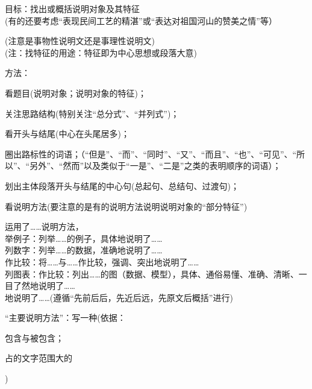 目标：找出或概括说明对象及其特征\\
(有的还要考虑``表现民间工艺的精湛''或``表达对祖国河山的赞美之情''等）\par
(注意是事物性说明文还是事理性说明文)\\
(注：找特征的用途：特征即为中心思想或段落大意)\par
方法：\begin{asparaenum}[(1)]\item 看题目(说明对象；说明对象的特征)；
        \item 关注思路结构(特别关注``总分式''、``并列式'')；
        \item 看开头与结尾(中心在头尾居多)；
        \item 圈出路标性的词语；（``但是''、``而''、``同时''、``又''、``而且''、``也''、``可见''、``所以''、``另外''、``然而''以及类似于``一是''、``二是''之类的表明顺序的词语）；
        \item 划出主体段落开头与结尾的中心句(总起句、总结句、过渡句)；
        \item 看说明方法(要注意的是有的说明方法说明说明对象的``部分特征'')\end{asparaenum}

运用了\ldots{}\ldots{}说明方法，\\
举例子：列举\ldots{}\ldots{}的例子，具体地说明了\ldots{}\ldots{}\\
列数字：列举\ldots{}\ldots{}的数据，准确地说明了\ldots{}\ldots{}\\
作比较：将\ldots{}\ldots{}与\ldots{}\ldots{}作比较，强调、突出地说明了\ldots{}\ldots{}\\
列图表：作比较：列出\ldots{}\ldots{}的图（数据、模型），具体、通俗易懂、准确、清晰、一目了然地说明了\ldots{}\ldots{}\\
地说明了\ldots{}\ldots{}(遵循``先前后后，先近后远，先原文后概括''进行)\par
``主要说明方法''：写一种(依据：\begin{inparaenum}[(1)]\item 包含与被包含；\item 占的文字范围大的\end{inparaenum})\\

